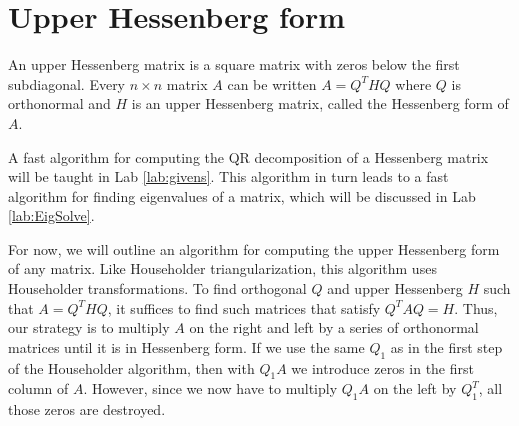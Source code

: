 \begin{comment}
Try the following to compute the condition number of $A$.
In this case the condition number of $A$ and $R$ are computed to be different, though, in theory, they should be exactly the same.
\begin{lstlisting}
>>> from numpy.linalg import cond
>>> cond(A)
4.1426075832870472e+18
>>> cond(R)
3.1767577244363792e+19
\end{lstlisting}

Householder QR factorization is more numerically stable than Gram-Schmidt or even Modified Gram-Schmidt (MGS).
However, MGS is still useful for some types of iterative methods because it finds the orthonormal basis one vector at a time instead of all at once (for an example see Lab \ref{lab:EigSolve}).
\end{comment}

\section*{Upper Hessenberg form}
An upper Hessenberg matrix is a square matrix with zeros below the first subdiagonal.
Every  $n \times n$ matrix $A$ can be written $A = Q^THQ$ where $Q$ is orthonormal and $H$ is an upper Hessenberg matrix, called the Hessenberg form of $A$.

A fast algorithm for computing the QR decomposition of a Hessenberg matrix will be taught in Lab \ref{lab:givens}. This algorithm in turn leads to a fast algorithm for finding eigenvalues of a matrix, which will be discussed in Lab \ref{lab:EigSolve}.

For now, we will outline an algorithm for computing the upper Hessenberg form of any matrix. 
Like Householder triangularization, this algorithm uses Householder transformations.
To find orthogonal $Q$ and upper Hessenberg $H$ such that $A = Q^THQ$, it suffices to find such matrices that satisfy $Q^TAQ=H$. 
Thus, our strategy is to multiply $A$ on the right and left by a series of orthonormal matrices until it is in Hessenberg form.
If we use the same $Q_1$ as in the first step of the Householder algorithm, then with $Q_1 A$ we introduce zeros in the first column of $A$.
However, since we now have to multiply $Q_1 A$ on the left by $Q_1^T$, all those zeros are destroyed.

